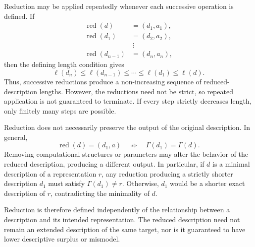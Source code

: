 Reduction may be applied repeatedly whenever each successive operation is defined. If
\[
\begin{aligned}
\operatorname{red}(d)&=(d_1,a_1),\\
\operatorname{red}(d_1)&=(d_2,a_2),\\
&\ \vdots\\
\operatorname{red}(d_{n-1})&=(d_n,a_n),
\end{aligned}
\]
then the defining length condition gives
\[
\ell(d_n)\leq\ell(d_{n-1})
\leq\cdots\leq\ell(d_1)\leq\ell(d).
\]
Thus, successive reductions produce a non-increasing sequence of reduced-description lengths. However, the reductions need not be strict, so repeated application is not guaranteed to terminate. If every step strictly decreases length, only finitely many steps are possible.

Reduction does not necessarily preserve the output of the original description. In general,
\[
\operatorname{red}(d)=(d_1,a) \quad\not\Rightarrow\quad \Gamma(d_1)=\Gamma(d).
\]
Removing computational structures or parameters may alter the behavior of the reduced description, producing
a different output. In particular, if $d$ is a minimal description of a representation $r$, any reduction producing a strictly shorter description $d_1$ must satisfy $\Gamma(d_1)\neq r$. Otherwise, $d_1$ would be a shorter exact description of $r$, contradicting the minimality of $d$.

Reduction is therefore defined independently of the relationship between a description and its intended representation. The reduced description need not remain an extended description of the same target, nor is it guaranteed to have lower descriptive surplus or mismodel.

